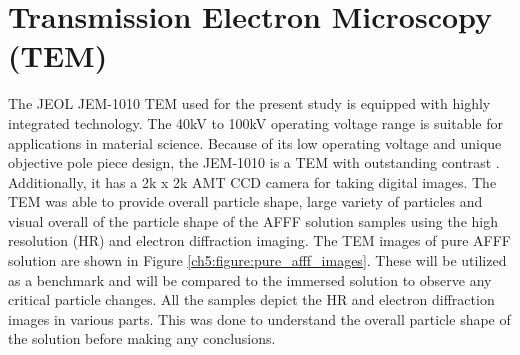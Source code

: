 \documentclass[12pt]{report}
\begin{document}
\section{Transmission Electron Microscopy (TEM)}
The JEOL JEM-1010 TEM used for the present study is equipped with highly integrated technology. The 40kV to 100kV operating voltage range is suitable for applications in material science. Because of its low operating voltage and unique objective pole piece design, the JEM-1010 is a TEM with outstanding contrast \cite{krimm1986vibrational}. Additionally, it has a 2k x 2k AMT CCD camera for taking digital images. The TEM was able to provide overall particle shape, large variety of particles and visual overall of the particle shape of the AFFF solution samples using the high resolution (HR) and electron diffraction imaging.  
The TEM images of pure AFFF solution are shown in Figure \ref{ch5:figure:pure_afff_images}. These will be utilized as a benchmark and will be compared to the immersed solution to observe any critical particle changes. All the samples depict the HR and electron diffraction images in various parts. This was done to understand the overall particle shape of the solution before making any conclusions. 
\end{document}
